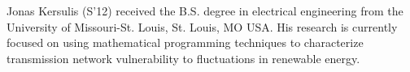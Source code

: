 \documentclass[journal,twoside]{IEEEtran}
\begin{document}




%
%
%

% 

\begin{IEEEbiography}{Jonas Kersulis}
(S'12) received the B.S. degree in electrical engineering from the University of Missouri-St. Louis, St. Louis, MO USA. His research is currently focused on using mathematical programming techniques to characterize transmission network vulnerability to fluctuations in renewable energy.
\end{IEEEbiography}
\end{document}
